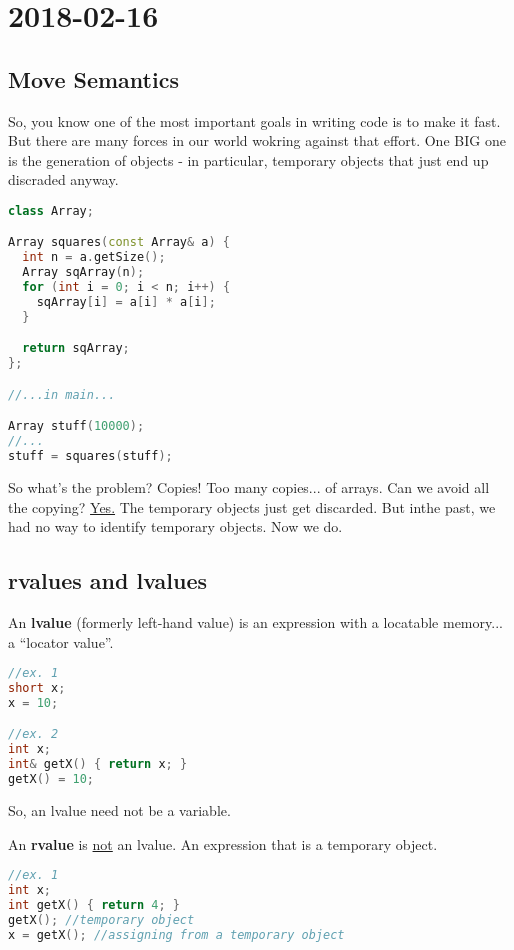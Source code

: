 \section{2018-02-16}

\subsection{Move Semantics}

So, you know one of the most important goals in writing code is to make it fast. But there are many forces in our world wokring against that effort. One BIG one is the generation of objects - in particular, temporary objects that just end up discraded anyway.

\begin{lstlisting}[language=C++]
class Array;

Array squares(const Array& a) {
  int n = a.getSize();
  Array sqArray(n);
  for (int i = 0; i < n; i++) {
    sqArray[i] = a[i] * a[i];
  }

  return sqArray;
};

//...in main...

Array stuff(10000);
//...
stuff = squares(stuff);
\end{lstlisting}

So what's the problem? Copies! Too many copies... of arrays. Can we avoid all the copying? \underline{Yes.} The temporary objects just get discarded. But inthe past, we had no way to identify temporary objects. Now we do.

\subsection{rvalues and lvalues}

An \textbf{lvalue} (formerly left-hand value) is an expression with a locatable memory... a ``locator value''.

\begin{lstlisting}[language=C++]
//ex. 1
short x; 
x = 10;

//ex. 2
int x;
int& getX() { return x; }
getX() = 10;
\end{lstlisting}

So, an lvalue need not be a variable.

An \textbf{rvalue} is \underline{not} an lvalue. An expression that is a temporary object.

\begin{lstlisting}[language=C++]
//ex. 1
int x;
int getX() { return 4; }
getX(); //temporary object
x = getX(); //assigning from a temporary object
\end{lstlisting}

